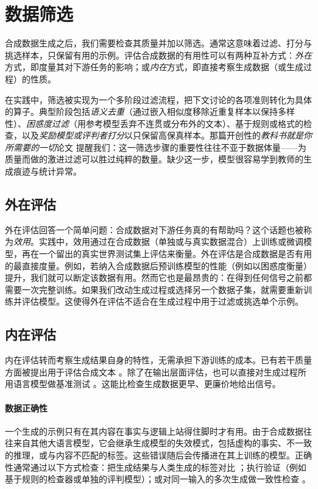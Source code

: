 \section{数据筛选}
\label{sec:data-cur}

合成数据生成之后，我们需要检查其质量并加以筛选。通常这意味着过滤、打分与挑选样本，只保留有用的示例。评估合成数据的有用性可以有两种互补方式：\emph{外在}方式，即度量其对下游任务的影响；或\emph{内在}方式，即直接考察生成数据（或生成过程）的性质。

在实践中，筛选被实现为一个多阶段过滤流程，把下文讨论的各项准则转化为具体的算子。典型阶段包括\emph{语义去重}（通过嵌入相似度移除近重复样本以保持多样性）、\emph{困惑度过滤}（用参考模型丢弃不连贯或分布外的文本）、基于规则或格式的检查，以及\emph{奖励模型或评判者打分}以只保留高保真样本。那篇开创性的{\em 教科书就是你所需要的一切}论文 \citep{gunasekar2023textbooksneed} 提醒我们：这一筛选步骤的重要性往往不亚于数据体量——为质量而做的激进过滤可以胜过纯粹的数量。缺少这一步，模型很容易学到教师的生成痕迹与统计异常。

\subsection{外在评估}
外在评估回答一个简单问题：合成数据对下游任务真的有帮助吗？这个话题也被称为\emph{效用}。实践中，效用通过在合成数据（单独或与真实数据混合）上训练或微调模型，再在一个留出的真实世界测试集上评估来衡量。外在评估是合成数据是否有用的最直接度量。例如，若纳入合成数据后预训练模型的性能（例如以困惑度衡量）提升，我们就可以断定该数据有用。然而它也是最昂贵的：在得到任何信号之前都需要一次完整训练。如果我们改动生成过程或选择另一个数据子集，就需要重新训练并评估模型。这使得外在评估不适合在生成过程中用于过滤或挑选单个示例。


\subsection{内在评估}
内在评估转而考察生成结果自身的特性，无需承担下游训练的成本。已有若干质量方面被提出用于评估合成文本 \citep{ramesh-etal-2025-synthtexteval}。除了在输出层面评估，也可以直接对生成过程所用语言模型做基准测试 \citep{kim-etal-2025-evaluating}。这能比检查生成数据更早、更廉价地给出信号。


\paragraph{数据正确性}
一个生成的示例只有在其内容在事实与逻辑上站得住脚时才有用。由于合成数据往往来自其他大语言模型，它会继承生成模型的失效模式，包括虚构的事实、不一致的推理，或与内容不匹配的标签。这些错误随后会传播进在其上训练的模型。正确性通常通过以下方式检查：把生成结果与人类生成的标签对比 \citep{long-etal-2024-llms, chim-etal-2025-evaluating}；执行验证（例如基于规则的检查器或单独的评判模型）\citep{chen-etal-2025-mastering, yang-etal-2025-longfaith, NEURIPS2024_4b77d5b8}；或对同一输入的多次生成做一致性检查 \citep{NEURIPS2022_639a9a17, seegmiller-etal-2025-flames}。


